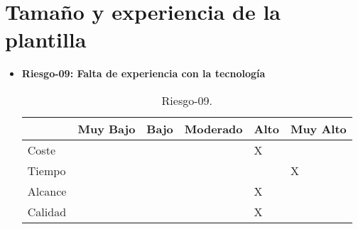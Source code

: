\section{Tamaño y experiencia de la plantilla}
\begin{itemize}
	\item \textbf{Riesgo-09: Falta de experiencia con la tecnología}
	\begin{table}[H]
	\begin{center}
	\begin{tabular}{ l l l l l l }
	\hline
	& Muy Bajo & Bajo & Moderado & Alto & Muy Alto \\ \hline \hline
	Coste &  &  &  & X &  \\ \hline
	Tiempo &  &  &  &  & X \\ \hline
	Alcance &  &  &  & X &  \\ \hline
	Calidad &  &  &  & X &  \\ \hline
	\end{tabular}
	\caption{Riesgo-09.}
	\label{Riesgo-09}
	\end{center}
	\end{table}
\end{itemize}
